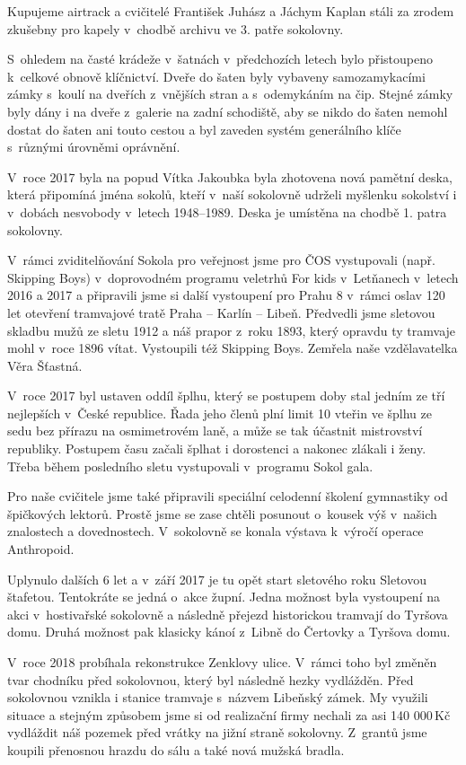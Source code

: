 \documentclass[a5paper, 11pt, twoside]{article}
\begin{document}
Kupujeme airtrack a cvičitelé František Juhász a Jáchym Kaplan stáli za
zrodem zkušebny pro kapely v~chodbě archivu ve 3. patře sokolovny.

S~ohledem na časté krádeže v~šatnách v~předchozích letech bylo
přistoupeno k~celkové obnově klíčnictví. Dveře do šaten byly vybaveny
samozamykacími zámky s~koulí na dveřích z~vnějších stran a s~odemykáním
na čip. Stejné zámky byly dány i na dveře z~galerie na zadní schodiště,
aby se nikdo do šaten nemohl dostat do šaten ani touto cestou a byl
zaveden systém generálního klíče s~různými úrovněmi oprávnění.

V~roce 2017 byla na popud Vítka Jakoubka byla zhotovena nová pamětní
deska, která připomíná jména sokolů, kteří v~naší sokolovně udrželi
myšlenku sokolství i v~dobách nesvobody v~letech 1948--1989.
Deska je umístěna na chodbě 1. patra sokolovny.

V~rámci zviditelňování Sokola pro veřejnost jsme pro ČOS vystupovali
(např. Skipping Boys) v~doprovodném programu veletrhů For kids
v~Letňanech v~letech 2016 a 2017 a připravili jsme si další vystoupení pro
Prahu 8 v~rámci oslav 120 let otevření tramvajové tratě Praha -- Karlín
-- Libeň. Předvedli jsme sletovou skladbu mužů ze sletu 1912 a náš
prapor z~roku 1893, který opravdu ty tramvaje mohl v~roce 1896 vítat.
Vystoupili též Skipping Boys. Zemřela naše vzdělavatelka Věra Šťastná.

V~roce 2017 byl ustaven oddíl šplhu, který se postupem doby stal jedním
ze tří nejlepších v~České republice. Řada jeho členů plní limit 10
vteřin ve šplhu ze sedu bez přírazu na osmimetrovém laně, a může se tak
účastnit mistrovství republiky. Postupem času začali šplhat i dorostenci
a nakonec zlákali i ženy. Třeba během posledního sletu vystupovali
v~programu Sokol gala.

Pro naše cvičitele jsme také připravili speciální celodenní školení
gymnastiky od špičkových lektorů. Prostě jsme se zase chtěli posunout
o~kousek výš v~našich znalostech a dovednostech. V~sokolovně se konala
výstava k~výročí operace Anthropoid.

Uplynulo dalších 6 let a v~září 2017 je tu opět start sletového roku
Sletovou štafetou. Tentokráte se jedná o~akce župní. Jedna možnost byla
vystoupení na akci v~hostivařské sokolovně a následně přejezd
historickou tramvají do Tyršova domu. Druhá možnost pak klasicky kánoí
z~Libně do Čertovky a Tyršova domu.

V~roce 2018 probíhala rekonstrukce Zenklovy ulice. V~rámci toho byl
změněn tvar chodníku před sokolovnou, který byl následně hezky
vydlážděn. Před sokolovnou vznikla i stanice tramvaje s~názvem Libeňský
zámek. My využili situace a stejným způsobem jsme si od realizační firmy
nechali za asi 140 000\,Kč vydláždit náš pozemek před vrátky na jižní
straně sokolovny. Z~grantů jsme koupili přenosnou hrazdu do sálu a také
nová mužská bradla.
\end{document}
